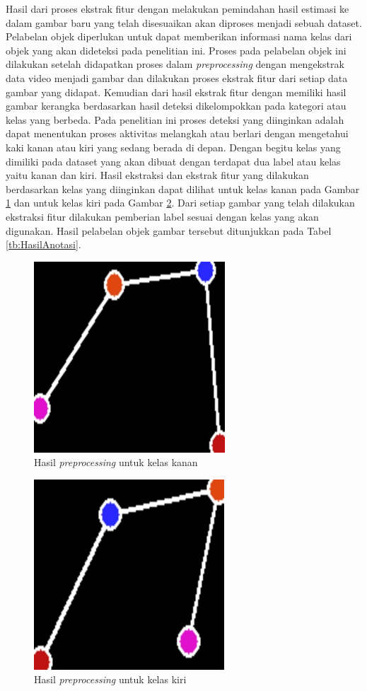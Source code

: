 Hasil dari proses ekstrak fitur dengan melakukan pemindahan hasil estimasi ke dalam gambar baru yang telah disesuaikan akan diproses menjadi sebuah dataset. Pelabelan objek diperlukan untuk dapat memberikan informasi nama kelas dari objek yang akan dideteksi pada penelitian ini. Proses pada pelabelan objek ini dilakukan setelah didapatkan proses dalam \emph{preprocessing} dengan mengekstrak data video menjadi gambar dan dilakukan proses ekstrak fitur dari setiap data gambar yang didapat. Kemudian dari hasil ekstrak fitur dengan memiliki hasil gambar kerangka berdasarkan hasil deteksi dikelompokkan pada kategori atau kelas yang berbeda. Pada penelitian ini proses deteksi yang diinginkan adalah dapat menentukan proses aktivitas melangkah atau berlari dengan mengetahui kaki kanan atau kiri yang sedang berada di depan. Dengan begitu kelas yang dimiliki pada dataset yang akan dibuat dengan terdapat dua label atau kelas yaitu kanan dan kiri. Hasil ekstraksi dan ekstrak fitur yang dilakukan berdasarkan kelas yang diinginkan dapat dilihat untuk kelas kanan pada Gambar \ref{fig:KelasKanan} dan untuk kelas kiri pada Gambar \ref{fig:KelasKiri}. Dari setiap gambar yang telah dilakukan ekstraksi fitur dilakukan pemberian label sesuai dengan kelas yang akan digunakan. Hasil pelabelan objek gambar tersebut ditunjukkan pada Tabel \ref{tb:HasilAnotasi}.

\begin{figure}[H]
  \centering
  \includegraphics[scale=0.8]{gambar/dataset kanan.png}
  \caption{Hasil \emph{preprocessing} untuk kelas kanan}
  \label{fig:KelasKanan}
\end{figure}

\begin{figure}[H]
  \centering
  \includegraphics[scale=0.8]{gambar/dataset kiri.png}
  \caption{Hasil \emph{preprocessing} untuk kelas kiri}
  \label{fig:KelasKiri}
\end{figure}

